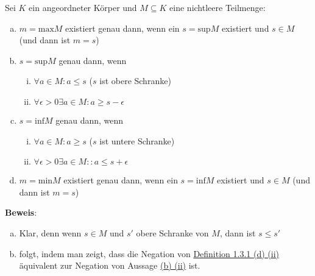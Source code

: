 \documentclass{article}
\begin{document}
Sei $K$ ein angeordneter Körper und $M \subseteq K$ eine nichtleere Teilmenge:
\begin{enumerate}[(a)]
\item $m = \text{max}M$ existiert genau dann, wenn ein $s = \text{sup}M$ existiert und $s \in M$
  (und dann ist $m = s$)
\item $s = \text{sup}M$ genau dann, wenn
  \begin{enumerate}[(i)]
  \item $\forall a \in M \colon a \leq s$ ($s$ ist obere Schranke)
  \item \label{sec:1.3.4_b_ii} $\forall \epsilon > 0 \exists a \in M \colon a \geq s - \epsilon$
  \end{enumerate}
\item $s = \text{inf}M$ genau dann, wenn
  \begin{enumerate}[(i)]
  \item $\forall a \in M \colon a \geq s$ ($s$ ist untere Schranke)
  \item $\forall \epsilon > 0 \exists a \in M \colon: a \leq s + \epsilon$
  \end{enumerate}
\item $m = \text{min}M$ existiert genau dann, wenn ein $s = \text{inf}M$ existiert und $s \in M$
  (und dann ist $m = s$)
\end{enumerate}

\textbf{Beweis}:
\begin{enumerate}[(a)]
\item Klar, denn wenn $s \in M$ und $s'$ obere Schranke von $M$, dann ist $s \leq s'$
\item folgt, indem man zeigt, dass die Negation von \hyperref[sec:1.3.1_d_ii]{Definition 1.3.1 (d) (ii)}
  äquivalent zur Negation von Aussage \hyperref[sec:1.3.4_b_ii]{(b) (ii)} ist.
\end{enumerate}
\end{document}
